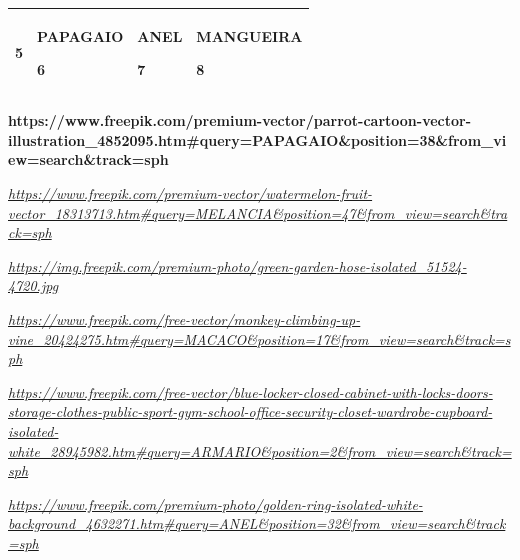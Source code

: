 \begin{longtable}[]{@{}llll@{}}
\begin{minipage}[t]{0.24\columnwidth}
5\strut
\end{minipage} & \begin{minipage}[t]{0.24\columnwidth}\raggedright\strut
PAPAGAIO

6\strut
\end{minipage} & \begin{minipage}[t]{0.24\columnwidth}\raggedright\strut
ANEL

7\strut
\end{minipage} & \begin{minipage}[t]{0.24\columnwidth}\raggedright\strut
MANGUEIRA

8\strut
\end{minipage}\tabularnewline
\bottomrule
\end{longtable}

\textbf{https://www.freepik.com/premium-vector/parrot-cartoon-vector-illustration\_4852095.htm\#query=PAPAGAIO\&position=38\&from\_view=search\&track=sph}

\href{https://www.freepik.com/premium-vector/watermelon-fruit-vector_18313713.htm\#query=MELANCIA\&position=47\&from_view=search\&track=sph}{\emph{https://www.freepik.com/premium-vector/watermelon-fruit-vector\_18313713.htm\#query=MELANCIA\&position=47\&from\_view=search\&track=sph}}

\href{https://img.freepik.com/premium-photo/green-garden-hose-isolated_51524-4720.jpg}{\emph{https://img.freepik.com/premium-photo/green-garden-hose-isolated\_51524-4720.jpg}}

\href{https://www.freepik.com/free-vector/monkey-climbing-up-vine_20424275.htm\#query=MACACO\&position=17\&from_view=search\&track=sph}{\emph{https://www.freepik.com/free-vector/monkey-climbing-up-vine\_20424275.htm\#query=MACACO\&position=17\&from\_view=search\&track=sph}}

\href{https://www.freepik.com/free-vector/blue-locker-closed-cabinet-with-locks-doors-storage-clothes-public-sport-gym-school-office-security-closet-wardrobe-cupboard-isolated-white_28945982.htm\#query=ARMARIO\&position=2\&from_view=search\&track=sph}{\emph{https://www.freepik.com/free-vector/blue-locker-closed-cabinet-with-locks-doors-storage-clothes-public-sport-gym-school-office-security-closet-wardrobe-cupboard-isolated-white\_28945982.htm\#query=ARMARIO\&position=2\&from\_view=search\&track=sph}}

\href{https://www.freepik.com/premium-photo/golden-ring-isolated-white-background_4632271.htm\#query=ANEL\&position=32\&from_view=search\&track=sph}{\emph{https://www.freepik.com/premium-photo/golden-ring-isolated-white-background\_4632271.htm\#query=ANEL\&position=32\&from\_view=search\&track=sph}}

